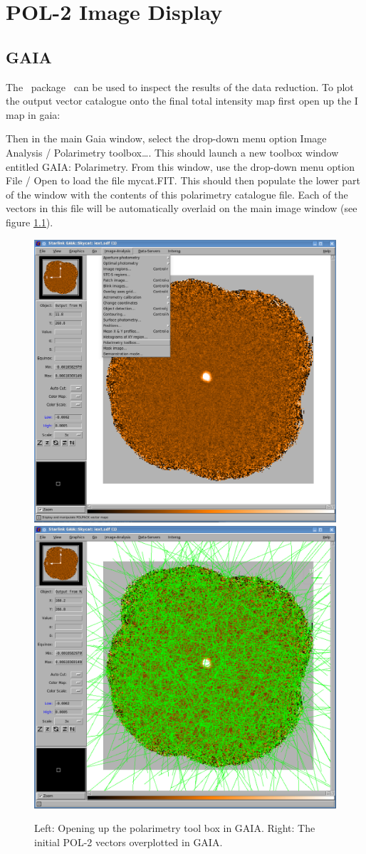 \chapter{POL-2 Image Display}
\label{sec:display}

\section{GAIA}

The \starlink\ package \gaia\ can be used to inspect the results of the data reduction.
To plot the output vector catalogue onto the final total intensity map
first open up the I map in gaia:

\begin{terminalv}
\end{terminalv}


Then in the main Gaia window, select the drop-down menu option Image Analysis /
Polarimetry toolbox…. This should launch a new toolbox window entitled
GAIA: Polarimetry. From this window, use the drop-down menu option
File / Open to load the file mycat.FIT. This should then populate the lower part of the
window with the contents of this polarimetry catalogue file.
Each of the vectors in this file will be automatically overlaid on the main image window
(see figure \ref{fig:gaia-plot-vectors1}).

\begin{figure}[t!]
\begin{center}
\includegraphics[width=0.46\linewidth]{sc22-gaia-plot-vectors-1.png}
\includegraphics[width=0.46\linewidth]{sc22-gaia-plot-vectors-3.png}
\label{fig:gaia-plot-vectors1}
\caption [Over Plotting Vectors in GAIA]{
  \small Left: Opening up the polarimetry tool box in GAIA. Right: The initial POL-2
vectors overplotted in GAIA.
}
\end{center}
\end{figure}

